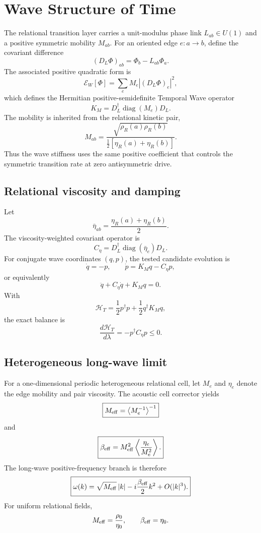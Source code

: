 \chapter{Wave Structure of Time}

The relational transition layer carries a unit-modulus phase link $L_{ab}\in U(1)$ and a positive symmetric mobility $M_{ab}$.  For an oriented edge $e:a\to b$, define the covariant difference
\[
(D_L\Phi)_{ab}=\Phi_b-L_{ab}\Phi_a.
\]
The associated positive quadratic form is
\[
\mathcal E_W[\Phi]
=\sum_e M_e |(D_L\Phi)_e|^2,
\]
which defines the Hermitian positive-semidefinite Temporal Wave operator
\[
\boxed{
K_M=D_L^\dagger\operatorname{diag}(M_e)D_L.
}
\]
The mobility is inherited from the relational kinetic pair,
\[
M_{ab}
=\frac{\sqrt{\rho_R(a)\rho_R(b)}}{\tfrac12[\eta_R(a)+\eta_R(b)]}.
\]
Thus the wave stiffness uses the same positive coefficient that controls the symmetric transition rate at zero antisymmetric drive.

\section{Relational viscosity and damping}

Let
\[
\bar\eta_{ab}=\frac{\eta_R(a)+\eta_R(b)}2.
\]
The viscosity-weighted covariant operator is
\[
\boxed{
C_\eta
=D_L^\dagger\operatorname{diag}(\bar\eta_e)D_L.
}
\]
For conjugate wave coordinates $(q,p)$, the tested candidate evolution is
\[
\dot q=-p,
\qquad
\dot p=K_Mq-C_\eta p,
\]
or equivalently
\[
\boxed{
\ddot q+C_\eta\dot q+K_Mq=0.
}
\]
With
\[
\mathcal H_T
=\frac12p^\dagger p+\frac12q^\dagger K_Mq,
\]
the exact balance is
\[
\boxed{
\frac{d\mathcal H_T}{d\lambda}
=-p^\dagger C_\eta p\le0.
}
\]

\section{Heterogeneous long-wave limit}

For a one-dimensional periodic heterogeneous relational cell, let $M_e$ and $\eta_e$ denote the edge mobility and pair viscosity.  The acoustic cell corrector yields
\[
\boxed{
M_{\rm eff}
=\left\langle M_e^{-1}\right\rangle^{-1}
}
\]
and
\[
\boxed{
\beta_{\rm eff}
=M_{\rm eff}^2
\left\langle\frac{\eta_e}{M_e^2}\right\rangle.
}
\]
The long-wave positive-frequency branch is therefore
\[
\boxed{
\omega(k)
=\sqrt{M_{\rm eff}}\,|k|
-i\frac{\beta_{\rm eff}}2k^2
+O(|k|^3).
}
\]
For uniform relational fields,
\[
M_{\rm eff}=\frac{\rho_0}{\eta_0},
\qquad
\beta_{\rm eff}=\eta_0.
\]

